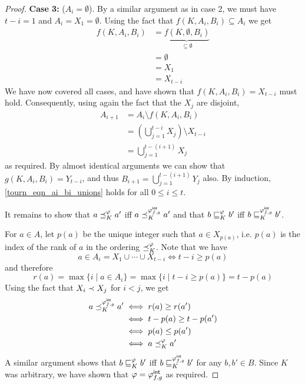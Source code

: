 \begin{proof}
    \textbf{Case 3:} ($A_i = \emptyset$). By a similar argument as in case 2,
    we must have $t - i = 1$ and $A_i = X_1 = \emptyset$. Using the fact that
    $f(K, A_i, B_i) \subseteq A_i$ we get
    \begin{align*}
        f(K, A_i, B_i)
        &= \underbrace{f(K, \emptyset, B_i)}_{\subseteq \emptyset} \\
        &= \emptyset \\
        &= X_1 \\
        &= X_{t-i}
    \end{align*}
    We have now covered all cases, and have shown that $f(K, A_i, B_i) =
    X_{t-i}$ must hold. Consequently, using again the fact that the $X_j$ are
    disjoint,
    \begin{align*}
        A_{i+1}
        &= A_i \setminus f(K, A_i, B_i) \\
        &= \left(\bigcup_{j=1}^{t-i}{X_j}\right) \setminus X_{t-i} \\
        &= \bigcup_{j=1}^{t-(i+1)}{X_j}
    \end{align*}
    as required. By almost identical arguments we can show that $g(K, A_i, B_i)
    = Y_{t-i}$, and thus $B_{i+1} = \bigcup_{j=1}^{t-(i+1)}{Y_j}$ also. By
    induction, \cref{tourn_eqn_ai_bi_unions} holds for all $0 \le i \le t$.

    It remains to show that $a \preceq_K^\varphi a'$ iff $a \preceq_K^{{\varphi_{f,g}^\mathsf{int}}} a'$
    and that $b \sqsubseteq_K^\varphi b'$ iff $b \sqsubseteq_K^{{\varphi_{f,g}^\mathsf{int}}} b'$.

    For $a \in A$, let $p(a)$ be the unique integer such that $a \in X_{p(a)}$,
    i.e. $p(a)$ is the index of the rank of $a$ in the ordering
    ${\preceq_K^\varphi}$. Note that we have
    \[
        a \in A_i = X_1 \cup \cdots \cup X_{t-i}
        \iff
        t - i \ge p(a)
    \]
    and therefore
    \[
        r(a)
        = \max\{i \mid a \in A_i\}
        = \max\{i \mid t - i \ge p(a)\}
        = t - p(a)
    \]
    Using the fact that $X_i \prec X_j$ for $i < j$, we get
    \begin{align*}
        a \preceq_K^{{\varphi_{f,g}^\mathsf{int}}} a'
        &\iff r(a) \ge r(a') \\
        &\iff t - p(a) \ge t - p(a') \\
        &\iff p(a) \le p(a') \\
        &\iff a \preceq_K^\varphi a'
    \end{align*}
    A similar argument shows that $b \sqsubseteq_K^\varphi b'$ iff $b
    \sqsubseteq_K^{{\varphi_{f,g}^\mathsf{int}}} b'$ for any $b, b' \in B$. Since $K$ was arbitrary, we
    have shown that $\varphi = {\varphi_{f,g}^\mathsf{int}}$ as required.
\end{proof}

